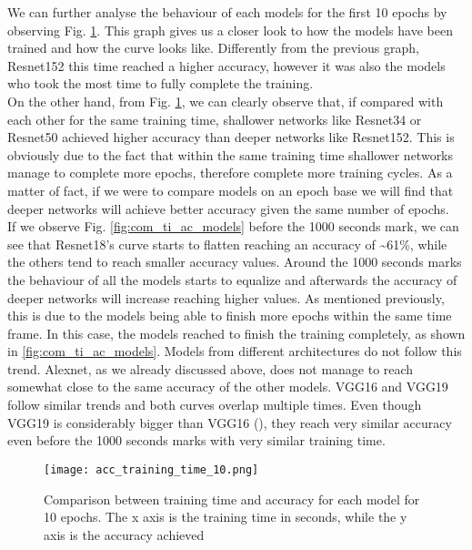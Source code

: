 We can further analyse the behaviour of each models for the first 10 epochs by observing Fig. \ref{fig:acc_training_10}. This graph gives us a closer look to how the models have been trained and how the curve looks like. Differently from the previous graph, Resnet152 this time reached a higher accuracy, however it was also the models who took the most time to fully complete the training.\\
On the other hand, from Fig. \ref{fig:acc_training_10}, we can clearly observe  that, if compared with each other for the same training time, shallower networks like Resnet34 or Resnet50 achieved higher accuracy than deeper networks like Resnet152. This is obviously due to the fact that within the same training time shallower networks manage to complete more epochs, therefore complete more training cycles. As a matter of fact, if we were to compare models on an epoch base we will find that deeper networks will achieve better accuracy given the same number of epochs. \\
If we observe Fig. \ref{fig:com_ti_ac_models} before the 1000 seconds mark, we can see that Resnet18's curve starts to flatten reaching an accuracy of \textasciitilde 61\%, while the others tend to reach smaller accuracy values. Around the 1000 seconds marks the behaviour of all the models starts to equalize and afterwards the accuracy of deeper networks will increase reaching higher values. As mentioned previously, this is due to the models being able to finish more epochs within the same time frame. In this case, the models reached to finish the training completely, as shown in \ref{fig:com_ti_ac_models}. 
Models from different architectures do not follow this trend. Alexnet, as we already discussed above, does not manage to reach somewhat close to the same accuracy of the other models. VGG16 and VGG19 follow similar trends and both curves overlap multiple times.  Even though VGG19 is considerably bigger than VGG16 (\cite{simonyan2015deep}), they reach very similar accuracy even before the 1000 seconds marks with very similar training time. \\
\begin{figure}[h]
       \centering 
	    \texttt{[image: acc\_training\_time\_10.png]}
        \caption[Comparison between training time and accuracy for each model for 10 epochs]{Comparison between training time and accuracy for each model for 10 epochs. The x axis is the training time in seconds, while the y axis is the accuracy achieved}
         \label{fig:acc_training_10}
\end{figure}


